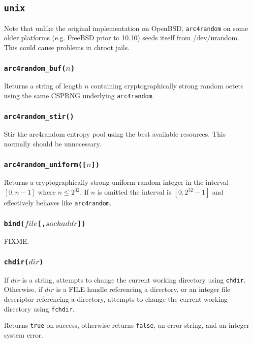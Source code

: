 \documentclass[11pt, oneside]{memoir}
\newcommand*{\true}[0]{\texttt{true}\xspace}
\newcommand*{\false}[0]{\texttt{false}\xspace}
\newcommand*{\syscall}[1]{\texttt{#1}\xspace}
\newcommand*{\fn}[1]{\texttt{#1}\xspace}
\newcounter{toccols}
\newenvironment{Module}[1]{
	\subsection{\texttt{#1}}
	\addtocontents{toc}{
		\protect\begin{multicols}{\value{toccols}}
	}
}{
	\addtocontents{toc}{\protect\end{multicols}}
}
\begin{document}
\begin{Module}{unix}
Note that unlike the original implementation on OpenBSD, \fn{arc4random} on some older platforms (e.g. FreeBSD prior to 10.10) seeds itself from /dev/urandom. This could cause problems in chroot jails.

\subsubsection[\fn{arc4random\_buf}]{\fn{arc4random\_buf($n$)}}

Returns a string of length $n$ containing cryptographically strong random octets using the same CSPRNG underlying \fn{arc4random}.

\subsubsection[\fn{arc4random\_stir}]{\fn{arc4random\_stir()}}

Stir the arc4random entropy pool using the best available resources. This normally should be unnecessary.

\subsubsection[\fn{arc4random\_uniform}]{\fn{arc4random\_uniform([$n$])}}

Returns a cryptographically strong uniform random integer in the interval $[0, n-1]$ where $n \leq 2^{32}$. If $n$ is omitted the interval is $[0, 2^{32}-1]$ and effectively behaves like \fn{arc4random}.

\subsubsection[\fn{bind}]{\fn{bind($file$[,$sockaddr$])}}

FIXME.

\subsubsection[\fn{chdir}]{\fn{chdir($dir$)}}

If $dir$ is a string, attempts to change the current working directory using \syscall{chdir}. Otherwise, if $dir$ is a FILE handle referencing a directory, or an integer file descriptor referencing a directory, attempts to change the current working directory using \syscall{fchdir}.

Returns \true on success, otherwise returns \false, an error string, and an integer system error.


\end{Module}
\end{document}
